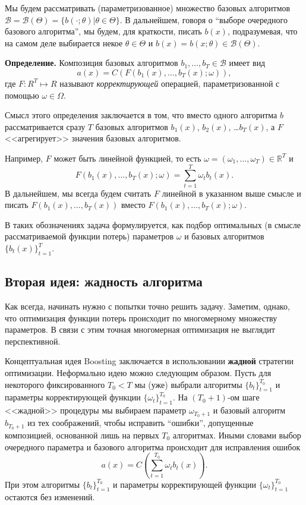 \documentclass[specialist, 12pt, href]{article}
\begin{document}
Мы будем рассматривать (параметризованное) множество базовых алгоритмов $\mathcal{B} = \mathcal B(\Theta) = \{b(\cdot; \theta) | \theta \in \Theta\}$.
В дальнейшем, говоря о “выборе очередного базового алгоритма”, мы будем, для краткости, писать $b(x)$, подразумевая, что на самом деле выбирается некое $\theta \in \Theta$ и $b(x) = b(x; \theta) \in \mathcal B(\Theta)$.

\textbf{Определение.} Композиция базовых алгоритмов $b_1,\dots, b_T \in \mathcal{B}$ имеет вид
$$a(x) = C(F(b_1(x),\ldots,b_T(x); \omega)),$$ 
где $F:R^T \mapsto R$ называют \textit{корректирующей} операцией, параметризованной с помощью $\omega \in \Omega$.

Смысл этого определения заключается в том, что вместо одного алгоритма $b$ рассматривается сразу $T$ базовых алгоритмов $b_1(x)$, $b_2(x)$, \ldots $b_T(x)$, а $F$ <<агрегирует>> значения базовых алгоритмов.

Например, $F$ может быть линейной функцией, то есть 
$\omega= (\omega_1, \ldots, \omega_T) \in \mathbb R^T$ и 
$$ F(b_1(x),\ldots,b_T(x); \omega) = \sum_{t=1}^T \omega_t b_t(x). $$
В дальнейшем, мы всегда будем считать  $F$ линейной в указанном выше смысле
и писать $F(b_1(x),\ldots,b_T(x))$ вместо $F(b_1(x),\ldots,b_T(x); \omega)$.

В таких обозначениях задача формулируется, как подбор оптимальных (в смысле рассматриваемой функции потерь) параметров $\omega$ и базовых алгоритмов $\{b_t(x)\}_{t=1}^T$.

\subsection*{Вторая идея: жадность алгоритма}
Как всегда, начинать нужно с попытки точно решить задачу.
Заметим, однако, что оптимизация функции потерь происходит по многомерному множеству параметров.
В связи с этим точная многомерная оптимизация не выглядит перспективной.

Концептуальная идея Boosting заключается в использовании \textbf{жадной} стратегии оптимизации.
Неформально идею можно следующим образом.
Пусть для некоторого фиксированного $T_0 < T$ мы (уже) выбрали алгоритмы $\{b_t\}_{t=1}^{T_0}$ и параметры корректирующей функции $\{\omega_t\}_{t=1}^{T_0}$.
На $(T_0 + 1)$-ом шаге <<жадной>> процедуры мы выбираем параметр $\omega_{T_0+1}$ и базовый алгоритм $b_{T_0 + 1}$ из тех соображений, чтобы исправить “ошибки”, допущенные композицией, основанной лишь на первых  $T_0$ алгоритмах.
Иными словами выбор очередного параметра и базового алгоритма происходит для исправления ошибок
$$ a(x) = C\left(\sum_{t=1}^{T_0} \omega_t b_t(x)\right). $$
При этом алгоритмы $\{b_t\}_{t=1}^{T_0}$ и параметры корректирующей функции $\{\omega_t\}_{t=1}^{T_0}$ остаются без изменений.
 
\end{document}
